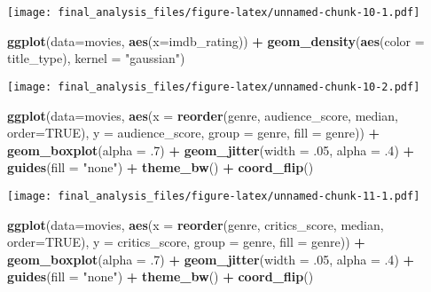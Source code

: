 \documentclass[]{article}
\newenvironment{Shaded}{\begin{snugshade}}{\end{snugshade}}
\newcommand{\DataTypeTok}[1]{\textcolor[rgb]{0.13,0.29,0.53}{#1}}
\newcommand{\FloatTok}[1]{\textcolor[rgb]{0.00,0.00,0.81}{#1}}
\newcommand{\KeywordTok}[1]{\textcolor[rgb]{0.13,0.29,0.53}{\textbf{#1}}}
\newcommand{\NormalTok}[1]{#1}
\newcommand{\OperatorTok}[1]{\textcolor[rgb]{0.81,0.36,0.00}{\textbf{#1}}}
\newcommand{\OtherTok}[1]{\textcolor[rgb]{0.56,0.35,0.01}{#1}}
\newcommand{\StringTok}[1]{\textcolor[rgb]{0.31,0.60,0.02}{#1}}
\begin{document}
\texttt{[image: final\_analysis\_files/figure-latex/unnamed-chunk-10-1.pdf]}

\begin{Shaded}
\begin{Highlighting}[]
\KeywordTok{ggplot}\NormalTok{(}\DataTypeTok{data=}\NormalTok{movies, }\KeywordTok{aes}\NormalTok{(}\DataTypeTok{x=}\NormalTok{imdb_rating)) }\OperatorTok{+}\StringTok{ }\KeywordTok{geom_density}\NormalTok{(}\KeywordTok{aes}\NormalTok{(}\DataTypeTok{color =}\NormalTok{ title_type), }\DataTypeTok{kernel =} \StringTok{"gaussian"}\NormalTok{)}
\end{Highlighting}
\end{Shaded}

\texttt{[image: final\_analysis\_files/figure-latex/unnamed-chunk-10-2.pdf]}

\begin{Shaded}
\begin{Highlighting}[]
\KeywordTok{ggplot}\NormalTok{(}\DataTypeTok{data=}\NormalTok{movies, }\KeywordTok{aes}\NormalTok{(}\DataTypeTok{x =} \KeywordTok{reorder}\NormalTok{(genre, audience_score, median, }\DataTypeTok{order=}\OtherTok{TRUE}\NormalTok{), }\DataTypeTok{y =}\NormalTok{ audience_score, }\DataTypeTok{group =}\NormalTok{ genre, }\DataTypeTok{fill =}\NormalTok{ genre)) }\OperatorTok{+}\StringTok{ }\KeywordTok{geom_boxplot}\NormalTok{(}\DataTypeTok{alpha =} \FloatTok{.7}\NormalTok{) }\OperatorTok{+}\StringTok{ }\KeywordTok{geom_jitter}\NormalTok{(}\DataTypeTok{width =} \FloatTok{.05}\NormalTok{, }\DataTypeTok{alpha =} \FloatTok{.4}\NormalTok{) }\OperatorTok{+}\StringTok{ }\KeywordTok{guides}\NormalTok{(}\DataTypeTok{fill =} \StringTok{"none"}\NormalTok{) }\OperatorTok{+}\StringTok{ }\KeywordTok{theme_bw}\NormalTok{() }\OperatorTok{+}\StringTok{ }\KeywordTok{coord_flip}\NormalTok{()}
\end{Highlighting}
\end{Shaded}

\texttt{[image: final\_analysis\_files/figure-latex/unnamed-chunk-11-1.pdf]}

\begin{Shaded}
\begin{Highlighting}[]
\KeywordTok{ggplot}\NormalTok{(}\DataTypeTok{data=}\NormalTok{movies, }\KeywordTok{aes}\NormalTok{(}\DataTypeTok{x =} \KeywordTok{reorder}\NormalTok{(genre, critics_score, median, }\DataTypeTok{order=}\OtherTok{TRUE}\NormalTok{), }\DataTypeTok{y =}\NormalTok{ critics_score, }\DataTypeTok{group =}\NormalTok{ genre, }\DataTypeTok{fill =}\NormalTok{ genre)) }\OperatorTok{+}\StringTok{ }\KeywordTok{geom_boxplot}\NormalTok{(}\DataTypeTok{alpha =} \FloatTok{.7}\NormalTok{) }\OperatorTok{+}\StringTok{ }\KeywordTok{geom_jitter}\NormalTok{(}\DataTypeTok{width =} \FloatTok{.05}\NormalTok{, }\DataTypeTok{alpha =} \FloatTok{.4}\NormalTok{) }\OperatorTok{+}\StringTok{ }\KeywordTok{guides}\NormalTok{(}\DataTypeTok{fill =} \StringTok{"none"}\NormalTok{) }\OperatorTok{+}\StringTok{ }\KeywordTok{theme_bw}\NormalTok{() }\OperatorTok{+}\StringTok{ }\KeywordTok{coord_flip}\NormalTok{()}
\end{Highlighting}
\end{Shaded}
\end{document}
